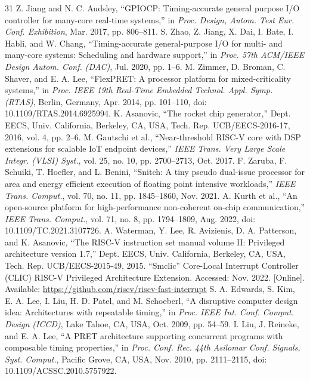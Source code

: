 \documentclass[letterpaper,journal]{IEEEtran}
\begin{document}
\begin{thebibliography}{31}
 Z. Jiang and N. C. Audsley, ``GPIOCP: Timing-accurate general purpose I/O controller for many-core real-time systems,'' in \textit{Proc. Design, Autom. Test Eur. Conf. Exhibition}, Mar. 2017, pp. 806--811.
 S. Zhao, Z. Jiang, X. Dai, I. Bate, I. Habli, and W. Chang, ``Timing-accurate general-purpose I/O for multi- and many-core systems: Scheduling and hardware support,'' in \textit{Proc. 57th ACM/IEEE Design Autom. Conf. (DAC)}, Jul. 2020, pp. 1--6.
 M. Zimmer, D. Broman, C. Shaver, and E. A. Lee, ``FlexPRET: A processor platform for mixed-criticality systems,'' in \textit{Proc. IEEE 19th Real-Time Embedded Technol. Appl. Symp. (RTAS)}, Berlin, Germany, Apr. 2014, pp. 101--110, doi: 10.1109/RTAS.2014.6925994.
 K. Asanovic, ``The rocket chip generator,'' Dept. EECS, Univ. California, Berkeley, CA, USA, Tech. Rep. UCB/EECS-2016-17, 2016, vol. 4, pp. 2--6.
 M. Gautschi et al., ``Near-threshold RISC-V core with DSP extensions for scalable IoT endpoint devices,'' \textit{IEEE Trans. Very Large Scale Integr. (VLSI) Syst.}, vol. 25, no. 10, pp. 2700--2713, Oct. 2017.
 F. Zaruba, F. Schuiki, T. Hoefler, and L. Benini, ``Snitch: A tiny pseudo dual-issue processor for area and energy efficient execution of floating point intensive workloads,'' \textit{IEEE Trans. Comput.}, vol. 70, no. 11, pp. 1845--1860, Nov. 2021.
 A. Kurth et al., ``An open-source platform for high-performance non-coherent on-chip communication,'' \textit{IEEE Trans. Comput.}, vol. 71, no. 8, pp. 1794--1809, Aug. 2022, doi: 10.1109/TC.2021.3107726.
 A. Waterman, Y. Lee, R. Avizienis, D. A. Patterson, and K. Asanovic, ``The RISC-V instruction set manual volume II: Privileged architecture version 1.7,'' Dept. EECS, Univ. California, Berkeley, CA, USA, Tech. Rep. UCB/EECS-2015-49, 2015.
 ``Smclic'' Core-Local Interrupt Controller (CLIC) RISC-V Privileged Architecture Extension. Accessed: Nov. 2022. [Online]. Available: \url{https://github.com/riscv/riscv-fast-interrupt}
 S. A. Edwards, S. Kim, E. A. Lee, I. Liu, H. D. Patel, and M. Schoeberl, ``A disruptive computer design idea: Architectures with repeatable timing,'' in \textit{Proc. IEEE Int. Conf. Comput. Design (ICCD)}, Lake Tahoe, CA, USA, Oct. 2009, pp. 54--59.
 I. Liu, J. Reineke, and E. A. Lee, ``A PRET architecture supporting concurrent programs with composable timing properties,'' in \textit{Proc. Conf. Rec. 44th Asilomar Conf. Signals, Syst. Comput.}, Pacific Grove, CA, USA, Nov. 2010, pp. 2111--2115, doi: 10.1109/ACSSC.2010.5757922.

\end{thebibliography}
\end{document}
